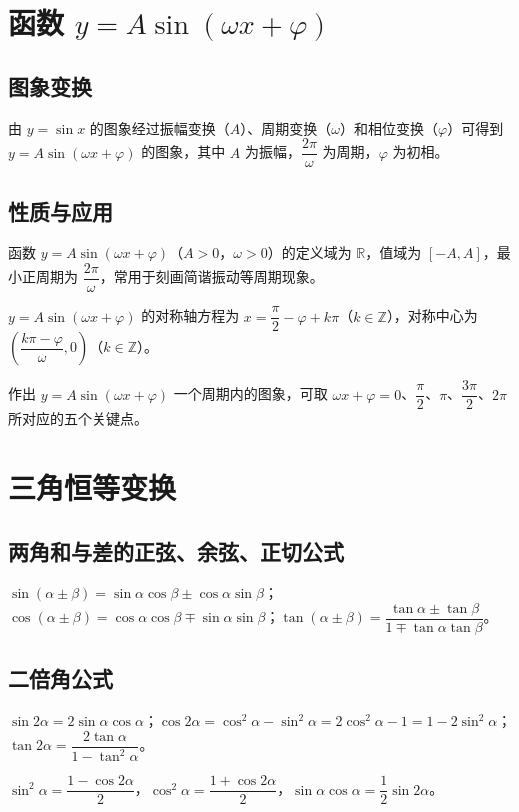 \documentclass[lang=cn,newtx,10pt,scheme=chinese,nofont]{elegantbook}
\begin{document}
\section{函数 \texorpdfstring{$y=A\sin(\omega x+\varphi)$}{y=Asin(ωx+φ)}}
\subsection{图象变换}
\begin{definition}[图象变换]
由 $y=\sin x$ 的图象经过振幅变换（$A$）、周期变换（$\omega$）和相位变换（$\varphi$）可得到 $y=A\sin(\omega x+\varphi)$ 的图象，其中 $A$ 为振幅，$\dfrac{2\pi}{\omega}$ 为周期，$\varphi$ 为初相。
\end{definition}
\subsection{性质与应用}
\begin{definition}[$y=A\sin(\omega x+\varphi)$ 的性质]
函数 $y=A\sin(\omega x+\varphi)$（$A>0$，$\omega>0$）的定义域为 $\mathbb{R}$，值域为 $[-A,A]$，最小正周期为 $\dfrac{2\pi}{\omega}$，常用于刻画简谐振动等周期现象。
\end{definition}
\begin{theorem}[图象的对称性]
$y=A\sin(\omega x+\varphi)$ 的对称轴方程为 $x=\dfrac{\pi}{2}-\varphi+k\pi$（$k \in \mathbb{Z}$），对称中心为 $\left(\dfrac{k\pi-\varphi}{\omega},0\right)$（$k \in \mathbb{Z}$）。
\end{theorem}
\begin{corollary}[五点法]
作出 $y=A\sin(\omega x+\varphi)$ 一个周期内的图象，可取 $\omega x+\varphi=0$、$\dfrac{\pi}{2}$、$\pi$、$\dfrac{3\pi}{2}$、$2\pi$ 所对应的五个关键点。
\end{corollary}

\section{三角恒等变换}
\subsection{两角和与差的正弦、余弦、正切公式}
\begin{definition}[两角和与差公式]
$\sin(\alpha \pm \beta)=\sin\alpha\cos\beta \pm \cos\alpha\sin\beta$；$\cos(\alpha \pm \beta)=\cos\alpha\cos\beta \mp \sin\alpha\sin\beta$；$\tan(\alpha \pm \beta)=\dfrac{\tan\alpha \pm \tan\beta}{1 \mp \tan\alpha\tan\beta}$。
\end{definition}
\subsection{二倍角公式}
\begin{definition}[二倍角公式]
$\sin 2\alpha=2\sin\alpha\cos\alpha$；$\cos 2\alpha=\cos^2\alpha-\sin^2\alpha=2\cos^2\alpha-1=1-2\sin^2\alpha$；$\tan 2\alpha=\dfrac{2\tan\alpha}{1-\tan^2\alpha}$。
\end{definition}
\begin{corollary}[降幂与半角公式]
$\sin^2\alpha=\dfrac{1-\cos 2\alpha}{2}$，$\cos^2\alpha=\dfrac{1+\cos 2\alpha}{2}$，$\sin\alpha\cos\alpha=\dfrac{1}{2}\sin 2\alpha$。
\end{corollary}
\end{document}
